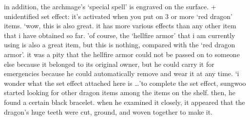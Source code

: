  in addition, the archmage’s ‘special spell’ is engraved on the surface.
+ unidentified set effect: it’s activated when you put on 3 or more ‘red dragon’ items.
‘wow, this is also great.
 it has more various effects than any other item that i have obtained so far.
’of course, the ‘hellfire armor’ that i am currently using is also a great item, but this is nothing, compared with the ‘red dragon armor’.
it was a pity that the hellfire armor could not be passed on to someone else because it belonged to its original owner, but he could carry it for emergencies because he could automatically remove and wear it at any time.
‘i wonder what the set effect attached here is …’to complete the set effect, sungwoo started looking for other dragon items among the items on the shelf.
then, he found a certain black bracelet.
 when he examined it closely, it appeared that the dragon’s huge teeth were cut, ground, and woven together to make it.

